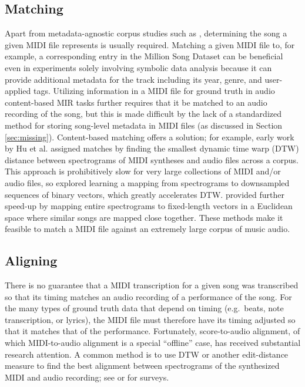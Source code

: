 \documentclass{article}
\begin{document}
\subsection{Matching}

Apart from metadata-agnostic corpus studies such as \cite{mauch2012corpus}, determining the song a given MIDI file represents is usually required.
Matching a given MIDI file to, for example, a corresponding entry in the Million Song Dataset \cite{bertin2011million} can be beneficial even in experiments solely involving symbolic data analysis because it can provide additional metadata for the track including its year, genre, and user-applied tags.
Utilizing information in a MIDI file for ground truth in audio content-based MIR tasks further requires that it be matched to an audio recording of the song, but this is made difficult by the lack of a standardized method for storing song-level metadata in MIDI files (as discussed in Section \ref{sec:missing}).
Content-based matching offers a solution; for example, early work by Hu et al.\cite{hu2003polyphonic} assigned matches by finding the smallest dynamic time warp (DTW) distance between spectrograms of MIDI syntheses and audio files across a corpus.
This approach is prohibitively slow for very large collections of MIDI and/or audio files, so \cite{raffel2015large} explored learning a mapping from spectrograms to downsampled sequences of binary vectors, which greatly accelerates DTW.
\cite{raffel2016pruning} provided further speed-up by mapping entire spectrograms to fixed-length vectors in a Euclidean space where similar songs are mapped close together.
These methods make it feasible to match a MIDI file against an extremely large corpus of music audio.

\subsection{Aligning}

There is no guarantee that a MIDI transcription for a given song was transcribed so that its timing matches an audio recording of a performance of the song.
For the many types of ground truth data that depend on timing (e.g.\ beats, note transcription, or lyrics), the MIDI file must therefore have its timing adjusted so that it matches that of the performance.
Fortunately, score-to-audio alignment, of which MIDI-to-audio alignment is a special ``offline'' case, has received substantial research attention. 
A common method is to use DTW or another edit-distance measure to find the best alignment between spectrograms of the synthesized MIDI and audio recording; see \cite{raffel2016optimizing} or \cite{ewert2012towards} for surveys.
\end{document}
